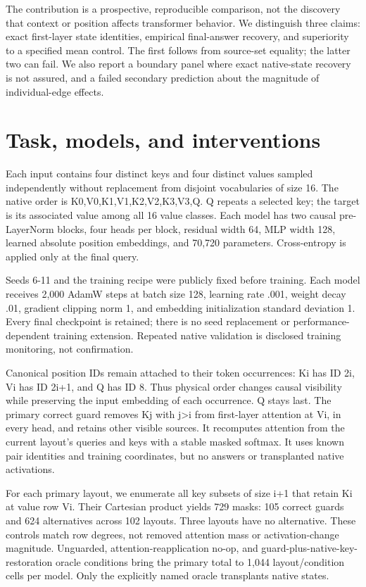 \documentclass[10pt,letterpaper]{article}
\begin{document}
The contribution is a prospective, reproducible comparison, not the discovery that context or position affects transformer behavior. We distinguish three claims: exact first-layer state identities, empirical final-answer recovery, and superiority to a specified mean control. The first follows from source-set equality; the latter two can fail. We also report a boundary panel where exact native-state recovery is not assured, and a failed secondary prediction about the magnitude of individual-edge effects.

\section{Task, models, and interventions}
Each input contains four distinct keys and four distinct values sampled independently without replacement from disjoint vocabularies of size 16. The native order is K0,V0,K1,V1,K2,V2,K3,V3,Q. Q repeats a selected key; the target is its associated value among all 16 value classes. Each model has two causal pre-LayerNorm blocks, four heads per block, residual width 64, MLP width 128, learned absolute position embeddings, and 70,720 parameters. Cross-entropy is applied only at the final query.

Seeds 6-11 and the training recipe were publicly fixed before training. Each model receives 2,000 AdamW steps at batch size 128, learning rate .001, weight decay .01, gradient clipping norm 1, and embedding initialization standard deviation 1. Every final checkpoint is retained; there is no seed replacement or performance-dependent training extension. Repeated native validation is disclosed training monitoring, not confirmation.

Canonical position IDs remain attached to their token occurrences: Ki has ID 2i, Vi has ID 2i+1, and Q has ID 8. Thus physical order changes causal visibility while preserving the input embedding of each occurrence. Q stays last. The primary correct guard removes Kj with j>i from first-layer attention at Vi, in every head, and retains other visible sources. It recomputes attention from the current layout's queries and keys with a stable masked softmax. It uses known pair identities and training coordinates, but no answers or transplanted native activations.

For each primary layout, we enumerate all key subsets of size i+1 that retain Ki at value row Vi. Their Cartesian product yields 729 masks: 105 correct guards and 624 alternatives across 102 layouts. Three layouts have no alternative. These controls match row degrees, not removed attention mass or activation-change magnitude. Unguarded, attention-reapplication no-op, and guard-plus-native-key-restoration oracle conditions bring the primary total to 1,044 layout/condition cells per model. Only the explicitly named oracle transplants native states.
\end{document}
